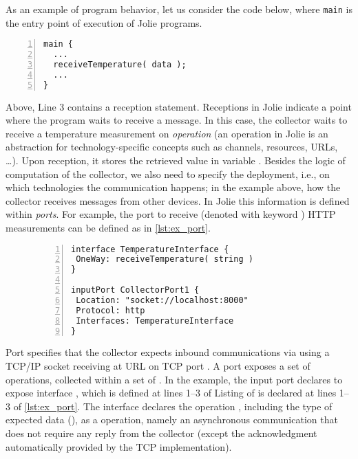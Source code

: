 As an example of program behavior, let us consider the code below, where \lstinline{main} is the entry point of execution of Jolie programs.
%
\begin{lstlisting}[numbers=left,basicstyle=\footnotesize\ttfamily]
main {
  ...
  receiveTemperature( data );
  ...
}
\end{lstlisting}
%
Above, Line 3 contains a reception statement.
Receptions in Jolie indicate a
point where the program waits to receive a message.
In this case, the collector
waits to receive a temperature measurement on \emph{operation}
 (an operation in Jolie is an abstraction for
technology-specific concepts such as channels, resources, URLs,
\dots). Upon reception, it stores the retrieved value in variable .
%
Besides the logic of computation of the collector, we also need to specify the deployment, i.e., on
which technologies the communication happens; in the example above, how the
collector receives messages from other devices. In Jolie this information is
defined within \emph{ports}. For example, the port to receive (denoted with
keyword ) HTTP measurements can be defined as in \cref{lst:ex_port}.
%
\begin{figure}
\begin{lstlisting}[numbers=left,basicstyle=\ttfamily\footnotesize,caption=Example of interface
and input port in Jolie.,label=lst:ex_port]
interface TemperatureInterface {
 OneWay: receiveTemperature( string )
}

inputPort CollectorPort1 {
 Location: "socket://localhost:8000"
 Protocol: http
 Interfaces: TemperatureInterface
}
\end{lstlisting}
\end{figure}
%
Port  specifies that the collector expects inbound
communications via   using a TCP/IP socket receiving
at URL  on TCP port . A port exposes a set of operations, collected within a set of . In the example, the input port  declares to expose interface , which is defined at lines 1--3 of Listing of  is declared at lines 1--3 of \cref{lst:ex_port}. The interface declares the operation
, including the type of expected data
(), as a  operation, namely an asynchronous
communication that does not require any reply from the collector (except the
acknowledgment automatically provided by the TCP implementation).

